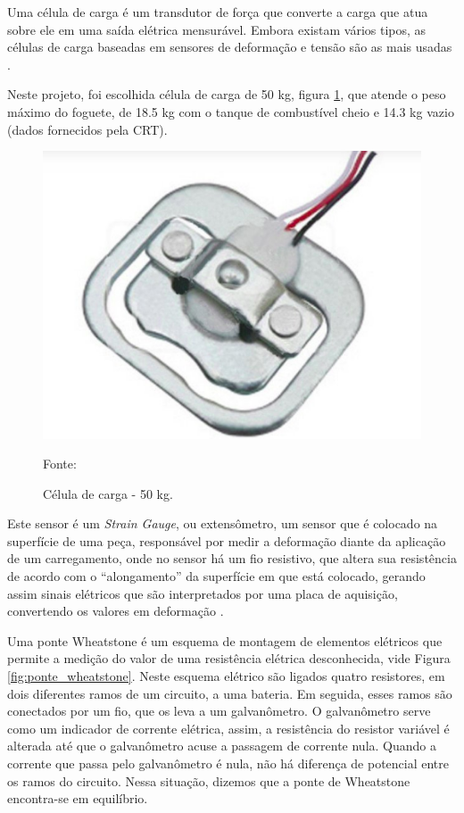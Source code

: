 \par Uma célula de carga é um transdutor de força que converte a carga que atua sobre ele em uma saída elétrica mensurável. Embora existam vários tipos, as células de carga baseadas em sensores de deformação e tensão são as mais usadas \cite{omega_celulacarga}. 

\par Neste projeto, foi escolhida célula de carga de 50 kg, figura \ref{fig:celula_carga}, que atende o peso máximo do foguete, de 18.5 kg com o tanque de combustível cheio e 14.3 kg vazio (dados fornecidos pela CRT).

\begin{figure}[H]
  \centering
  \includegraphics[scale=0.5]{figuras/celula_carga.png}
  \caption{Célula de carga - 50 kg.}
  {\footnotesize Fonte: \cite{figura_celula}} 
  \label{fig:celula_carga}
\end{figure}

\par Este sensor é um \textit{Strain Gauge}, ou extensômetro, um sensor que é colocado na superfície de uma peça, responsável por medir a deformação diante da aplicação de um carregamento, onde no sensor há um fio resistivo, que altera sua resistência de acordo com o “alongamento” da superfície em que está colocado, gerando assim sinais elétricos que são interpretados por uma placa de aquisição, convertendo os valores em deformação \cite{strain_gauge}.

\par Uma ponte Wheatstone é um esquema de montagem de elementos elétricos que permite a medição do valor de uma resistência elétrica desconhecida, vide Figura \ref{fig:ponte_wheatstone}. Neste esquema elétrico são ligados quatro resistores, em dois diferentes ramos de um circuito, a uma bateria. Em seguida, esses ramos são conectados por um fio, que os leva a um galvanômetro. O galvanômetro serve como um indicador de corrente elétrica, assim, a resistência do resistor variável é alterada  até que o galvanômetro acuse a passagem de corrente nula. Quando a corrente que passa pelo galvanômetro é nula, não há diferença de potencial entre os ramos do circuito. Nessa situação, dizemos que a ponte de Wheatstone encontra-se em equilíbrio.

